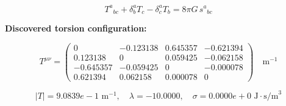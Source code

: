 
\begin{equation}
  T^a{}_{bc} + \delta^a_b T_c - \delta^a_c T_b = 8\pi G \, s^a{}_{bc}
\end{equation}

\textbf{Discovered torsion configuration:}

\begin{equation}
  T^{\mu\nu} = \begin{pmatrix}
    0 & -0.123138 & 0.645357 & -0.621394 \\
    0.123138 & 0 & 0.059425 & -0.062158 \\
    -0.645357 & -0.059425 & 0 & -0.000078 \\
    0.621394 & 0.062158 & 0.000078 & 0
  \end{pmatrix} \quad \text{m}^{-1}
\end{equation}

\begin{equation}
  |T| = 9.0839e-1 \text{ m}^{-1}, \quad
  \lambda = -10.0000, \quad
  \sigma = 0.0000e+0 \text{ J}\cdot\text{s/m}^3
\end{equation}